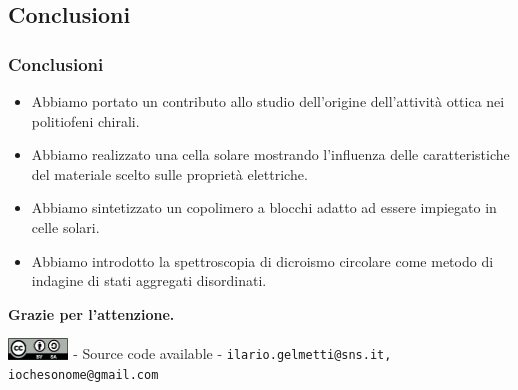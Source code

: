 \documentclass{beamer}
\begin{document}
\subsection{Conclusioni}
\begin{frame}%
\frametitle{Conclusioni}
\begin{itemize}
\item Abbiamo portato un contributo allo studio dell'origine dell'attività ottica nei politiofeni chirali.
\item Abbiamo realizzato una cella solare mostrando l'influenza delle caratteristiche del materiale scelto sulle proprietà elettriche.
\item Abbiamo sintetizzato un copolimero a blocchi adatto ad essere impiegato in celle solari.
\item Abbiamo introdotto la spettroscopia di dicroismo circolare come metodo di indagine di stati aggregati disordinati.
\end{itemize}
\pause
\vfill
\begin{center}
\Huge \textbf{Grazie per l'attenzione.}

\includegraphics[width=0.12\textwidth]{img/cc-by-sa.pdf} - Source code available - \texttt{ilario.gelmetti@sns.it, iochesonome@gmail.com}


\end{center}
\end{frame}
\end{document}
